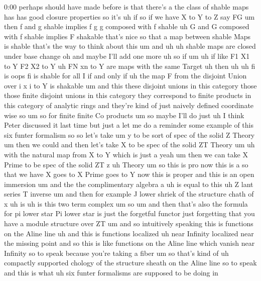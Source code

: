 \begin{unfinished}{0:00}
perhaps  should  have  made  before  is  that
there's  a  the  class  of  shable
maps
has  has  good  closure
properties  so  it's  uh  if  so  if  we  have  X
to  Y  to  Z  say
FG  um  then  f  and  g
shable  implies  f  g  g  composed  with  f
shable
uh  G  and  G  composed  with  f
shable  implies  F
shakable  that's  nice  so  that  a  map
between  shable  Maps  is  shable  that's  the
way  to  think  about  this  um  and  uh  uh
shable  maps  are  closed  under  base
change
oh  and  maybe  I'll  add  one
more  uh  so
if
um
uh  if  like  F1  X1  to  Y  F2  X2  to  Y  uh  FN
xn  to  Y  are  maps  with  the  same  Target  uh
then  uh  uh  fi  is  oops  fi  is
shable  for  all  I  if  and  only  if  uh  the
map  F  from  the  disjoint  Union  over  i  x  i
to  Y  is
shakable
um  and  this  these  disjoint  unions  in
this  category  those  those  finite
disjoint  unions  in  this  category  they
correspond  to  finite  products  in  this
category  of  analytic  rings  and  they're
kind  of  just  naively  defined  coordinate
wise  so
um  so  for  finite  finite  Co
products
um  so  maybe  I'll  do  just  uh  I  think
Peter  discussed  it  last  time  but  just  a
let  me  do  a  reminder  some  example  of
this  six  funter  formalism
so  so  let's  take
um  y  to  be  sort  of  spec
of  the  solid  Z
Theory
um  then  we  could  and  then  let's  take  X
to  be  spec  of  the  solid  ZT
Theory
um  uh  with  the  natural  map  from  X  to  Y
which  is  just  a
yeah  um  then  we  can
take  X  Prime  to  be  spec  of  the  solid  ZT
z  uh
Theory
um  so  this  is  pro  now  this  is  a  so  that
we  have  X  goes  to  X  Prime  goes  to  Y  now
this  is
proper  and  this  is  an  open
immersion
um  and  the  the  complimentary  algebra
a
uh  is  equal  to  this  uh  Z  lant  series  T
inverse
um  and  then  for  example  J  lower  shriek
of  the  structure  chath  of  x  uh  is  uh  is
this  two  term  complex
um
so
um  and  then  that's  also  the  formula  for
pi  lower  star  Pi  lower  star  is  just  the
forgetful  functor  just  forgetting  that
you  have  a  module  structure  over  ZT  um
and  so  intuitively  speaking  this  is
functions  on  the  Aline
line  uh  and  this  is  functions  localized
uh  near  Infinity  localized  near  the
missing  point  and  so  this  is  like
functions  on  the  Aline  line  which  vanish
near  Infinity  so  to  speak  because  you're
taking  a  fiber  um  so  that's  kind  of  uh
compactly  supported  chology  of  the
structure  sheath  on  the  Aline
line  so  to
speak  and  this  is  what  uh  six  funter
formalisms  are  supposed  to  be  doing  in

\end{unfinished}
